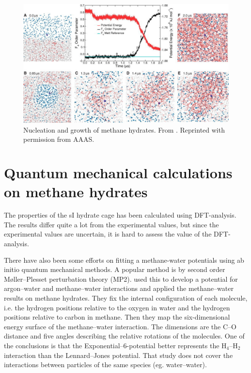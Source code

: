\begin{figure}
\centering
\includegraphics[width=\textwidth]{../pictures/methane_hydrate_growth.pdf}
\caption{Nucleation and growth of methane hydrates. From \citet{Walsh2009}. Reprinted with permission from AAAS.}
\label{fig:methane_hydrate_growth}
\end{figure}

\section{Quantum mechanical calculations on methane hydrates}
The properties of the sI hydrate cage has been calculated using DFT-analysis. The results differ quite a lot from the experimental values, but since the experimental values are uncertain, it is hard to assess the value of the DFT-analysis.

There have also been some efforts on fitting a methane-water potentials using ab initio quantum mechanical methods. A popular method is by second order Møller--Plesset perturbation theory (MP2). \citet{Anderson2004} used this to develop a potential for argon--water and methane--water interactions and applied the methane--water results on methane hydrates. They fix the internal configuration of each molecule, i.e. the hydrogen positions relative to the oxygen in water and the hydrogen positions relative to carbon in methane. Then they map the six-dimensional energy surface of the methane--water interaction. The dimensions are the C--O distance and five angles describing the relative rotations of the molecules. One of the conclusions is that the Exponential--6-potential better represents the H$_4$--H$_2$ interaction than the Lennard--Jones potential. That study does not cover the interactions between particles of the same species (eg. water--water).



